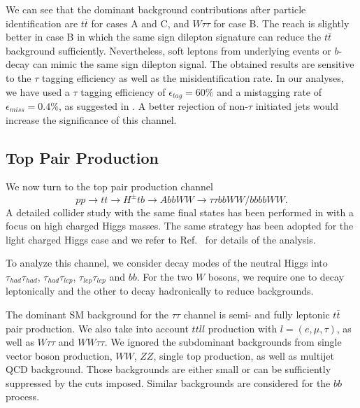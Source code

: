 We can see that the dominant background contributions after particle identification are $t\overline{t}$ for cases A and C, and $W\tau\tau$ for case B. The reach is slightly better in case B in which the same sign dilepton signature can reduce the $t\bar{t}$ background sufficiently. Nevertheless, soft leptons from underlying events or $b$-decay can mimic the same sign dilepton signal. The obtained results are sensitive to the $\tau$ tagging efficiency as well as the misidentification rate. In our analyses, we have used a $\tau$ tagging efficiency of $\epsilon_{tag}=60\%$ and a mistagging rate of $\epsilon_{miss}=0.4\%$, as suggested in \cite{Anderson:2013kxz}. A better rejection of non-$\tau$ initiated jets would increase the significance of this channel. 

\subsection{Top Pair Production }
 \label{sec:light_charged_analysis_tt}

We now turn to the top pair production channel 
\begin{equation}
pp \rightarrow tt \rightarrow H^{\pm} tb \rightarrow AbbWW\rightarrow \tau\tau bbWW/bbbbWW.
\end{equation} 
A detailed collider study with the same final states has been performed in \cite{Coleppa:2014cca} with a focus on high charged Higgs masses. The same strategy has been adopted for the light charged Higgs case and we refer to Ref.~\cite{Coleppa:2014cca} for details of the analysis. 

To analyze this channel, we consider decay modes of the neutral Higgs into $\tau_{had}\tau_{had}$, $\tau_{had}\tau_{lep}$, $\tau_{lep}\tau_{lep}$ and $bb$. For the two $W$ bosons, we require one to decay leptonically and the other to decay hadronically to reduce backgrounds.
 
 The dominant SM background for the $\tau\tau$ channel is semi- and fully leptonic $t\bar{t}$ pair production. We also take into account $ttll$ production with $l = (e, \mu, \tau)$, as well as $W\tau\tau$ and $WW\tau\tau$. We ignored the subdominant backgrounds from single vector boson production, $WW$, $ZZ$, single top production, as well as multijet QCD background. Those backgrounds are either small or can be sufficiently suppressed by the cuts imposed. Similar backgrounds are considered for the $bb$ process. 

